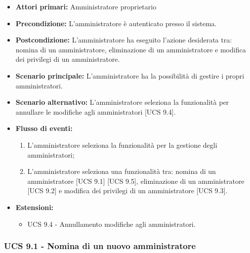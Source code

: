 \begin{itemize}

\item \textbf{Attori primari:} Amministratore proprietario
\item \textbf{Precondizione:} L'amministratore è autenticato presso il sistema.
\item \textbf{Postcondizione:} L'amministratore ha eseguito l'azione desiderata tra: nomina di un amministratore, eliminazione di un amministratore e modifica dei privilegi di un amministratore.
\item \textbf{Scenario principale:} L'amministratore ha la possibilità di gestire i propri amministratori.
\item \textbf{Scenario alternativo:} L'amministratore seleziona la funzionalità per annullare le modifiche agli amministratori [UCS 9.4].
\item \textbf{Flusso di eventi:} %
  \begin{enumerate}
        \item L'amministratore seleziona la funzionalità per la gestione degli amministratori;
        \item L'amministratore seleziona una funzionalità tra: nomina di un amministratore [UCS 9.1] [UCS 9.5], eliminazione di un amministratore [UCS 9.2] e modifica dei privilegi di un amministratore [UCS 9.3].
    \end{enumerate}
\item \textbf{Estensioni:}
	\begin{itemize}
		\item UCS 9.4 - Annullamento modifiche agli amministratori.
	\end{itemize}
\end{itemize}


\subsubsection{UCS 9.1 - Nomina di un nuovo amministratore}%

